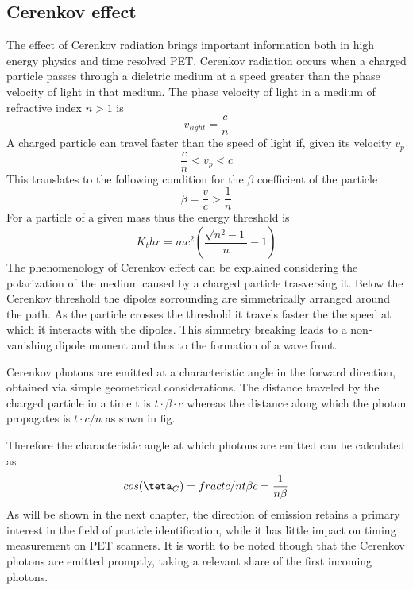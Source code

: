 \subsection{Cerenkov effect}
The effect of Cerenkov radiation brings important information both in high energy physics and time resolved PET.
Cerenkov radiation occurs when a charged particle passes through a dieletric medium at a speed greater than the phase velocity of light in that medium.
The phase velocity of light in a medium of refractive index $n > 1$ is
\begin{equation}
v_{light} = \frac{c}{n}
\end{equation}
A charged particle can travel faster than the speed of light if, given its velocity $v_{p}$ 
\begin{equation}
\frac{c}{n} < v_{p} < c
\end{equation}
This translates to the following condition for the $\beta$ coefficient of the particle
\begin{equation}
\beta = \frac{v}{c} > \frac{1}{n}
\end{equation}
For a particle of a given mass thus the energy threshold is
\begin{equation}
K_thr = mc^{2}\left( \frac{\sqrt {n^{2}-1}}{n} - 1 \right)
\end{equation}
The phenomenology of Cerenkov effect can be explained considering the polarization of the medium caused by a charged particle trasversing it.
Below the Cerenkov threshold the dipoles sorrounding are simmetrically arranged around the path. As the particle crosses the threshold it travels faster the the speed at which it interacts with the dipoles. This simmetry breaking leads to a non-vanishing dipole moment and thus to the formation of a wave front.

Cerenkov photons are emitted at a characteristic angle in the forward direction, obtained via simple geometrical considerations. The distance traveled by the charged particle in a time t is $t\cdot \beta \cdot c$ whereas the distance along which the photon propagates is $t\cdot c /n$ as shwn in fig.

Therefore the characteristic angle at which photons are emitted can be calculated as
\begin{equation}
cos(\teta _{C}) = frac{t c/n}{t \beta c} = \frac{1}{n\beta}
\end{equation}
As will be shown in the next chapter, the direction of emission retains a primary interest in the field of particle identification, while it has little impact on timing measurement on PET scanners. It is worth to be noted though that the Cerenkov photons are emitted promptly, taking a relevant share of the first incoming photons.  

